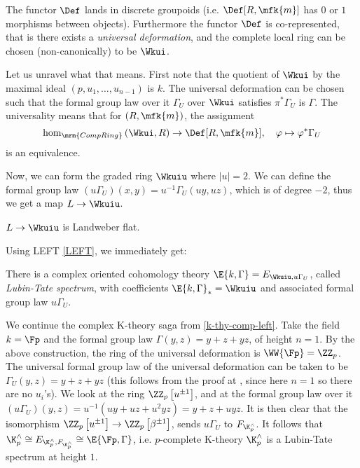 \begin{theorem}
	The functor $\Def$ lands in discrete groupoids (i.e. $\Def[R, \mfk{m}]$ has $0$ or $1$ morphisms between objects).
	Furthermore the functor $\Def$ is co-represented, that is there exists a \emph{universal deformation}, and the complete local ring can be chosen (non-canonically) to be $\Wkui$.
\end{theorem}

Let us unravel what that means.
First note that the quotient of $\Wkui$ by the maximal ideal $\left(p, u_1, \dotsc, u_{n-1}\right)$ is $k$.
The universal deformation can be chosen such that the formal group law over it $\Gamma_U$ over $\Wkui$ satisfies $\pi^* \Gamma_U$ is $\Gamma$.
The universality means that for $\left(R, \mfk{m}\right)$, the assignment
$$
\hom_{\mrm{CompRing}}\left(\Wkui, R\right) \to \Def[R, \mfk{m}], \quad
\varphi \mapsto \varphi^* \Gamma_U
$$
is an equivalence.

Now, we can form the graded ring $\Wkuiu$ where $\left|u\right| = 2$.
We can define the formal group law $\left(u \Gamma_U\right) \left(x, y\right) = u^{-1} \Gamma_U \left(u y, u z\right)$, which is of degree $-2$, thus we get a map $L \to \Wkuiu$.

\begin{proposition}
	$L \to \Wkuiu$ is Landweber flat.
\end{proposition}

Using LEFT \ref{LEFT}, we immediately get:

\begin{corollary}\label{lt-spectrum}
	There is a complex oriented cohomology theory $\E{k, \Gamma} = E_{\Wkuiu, u \Gamma_U}$, called \emph{Lubin-Tate spectrum}, with coefficients $\E{k, \Gamma}_* = \Wkuiu$ and associated formal group law $u \Gamma_U$.
\end{corollary}

\begin{example}\label{k-thy-comp-defo}
	We continue the complex K-theory saga from \ref{k-thy-comp-left}.
	Take the field $k = \Fp$ and the formal group law $\Gamma\left(y, z\right) = y + z + y z$, of height $n = 1$.
	By the above construction, the ring of the universal deformation is $\WW{\Fp} = \ZZ_p$.
	The universal formal group law of the universal deformation can be taken to be $\Gamma_U \left(y, z\right) = y + z + y z$ (this follows from the proof at \cite[5.10]{Rez}, since here $n=1$ so there are no $u_i$'s).
	We look at the ring $\ZZ_p\left[u^{\pm1}\right]$, and at the formal group law over it
	$
	\left(u\Gamma_U\right) \left(y, z\right)
	= u^{-1} \left(u y + u z + u^2 y z\right)
	= y + z + u y z
	$.
	It is then clear that the isomorphism $\ZZ_p\left[u^{\pm1}\right] \to \ZZ_p\left[\beta^{\pm1}\right]$, sends $u\Gamma_U$ to $F_{\K_p^\wedge}$.
	It follows that
	$
	\K_p^\wedge
	\cong E_{\K_p^\wedge, F_{\K_p^\wedge}}
	\cong \E{\Fp, \Gamma}
	$,
	i.e. $p$-complete K-theory $\K_p^\wedge$ is a Lubin-Tate spectrum at height $1$.
\end{example}

